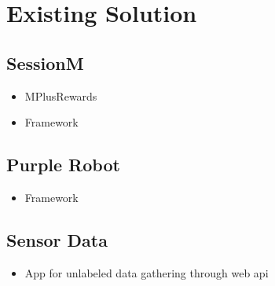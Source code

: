 
\section{Existing Solution}
\label{sec:existing_solution}

\subsection{SessionM}
\label{sub:sessionm}

\begin{itemize}
	\item MPlusRewards
	\item Framework
\end{itemize}


\subsection{Purple Robot}
\label{sub:purple_robot}

\begin{itemize}
	\item Framework
\end{itemize}

\subsection{Sensor Data} 
\label{sub:sensor_data}

\begin{itemize}
	\item App for unlabeled data gathering through web api
\end{itemize}




